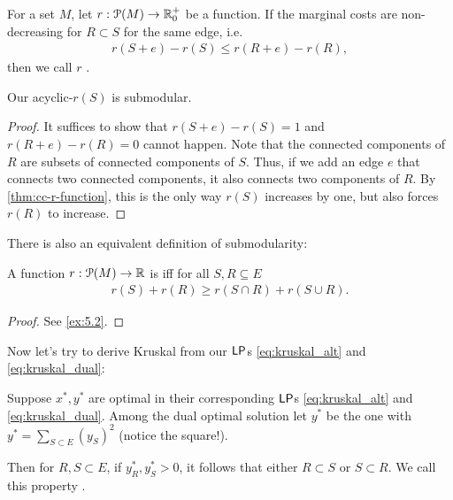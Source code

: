 \begin{definition}
    For a set $M$, let $r : \mathcal P(M) \rightarrow \realnum^+_0$ be a function.
    If the marginal costs are non-decreasing for $R \subset S$ for the same edge, i.e.
    \begin{align*}
        r(S+e)-r(S) \leq r(R+e) - r(R),
    \end{align*}
    then we call $r$ .
\end{definition}
\begin{theorem}
    Our acyclic-$r(S)$ is submodular.
\end{theorem}
\begin{proof}
    It suffices to show that $r(S+e)-r(S)=1$ and $r(R+e)-r(R)=0$ cannot happen.
    Note that the connected components of $R$ are subsets of connected components of $S$. Thus, if we add an edge $e$ that connects two
    connected components, it also connects two components of $R$. By \autoref{thm:cc-r-function}, this is the only way $r(S)$ increases by one,
    but also forces $r(R)$ to increase.
\end{proof}
There is also an equivalent definition of submodularity:
\begin{theorem} \label{thm:submodularity}
    A function $r : \mathcal{P}(M) \rightarrow \realnum$ is  iff for all $S,R \subseteq E$
    \begin{align*}
        r(S)+r(R) \geq r(S\cap R) + r(S \cup R).
    \end{align*}
\end{theorem}
\begin{proof}
    See \autoref{ex:5.2}.
\end{proof}
Now let's try to derive Kruskal from our $\mathsf{LP}$s \eqref{eq:kruskal_alt} and \eqref{eq:kruskal_dual}:
\begin{lemma}
    Suppose $x^*,y^*$ are optimal in their corresponding $\mathsf{LP}$s  \eqref{eq:kruskal_alt} and \eqref{eq:kruskal_dual}.
    Among the dual optimal
    solution let $y^*$ be the one with $y^*=\sum_{S\subset E}(y_S)^2$ (notice the square!).

    Then for $R,S \subset E$, if $y_R^*, y_S^* > 0$, it follows that either $R \subset S$ or $S \subset R$.
    We call this property .
\end{lemma}
